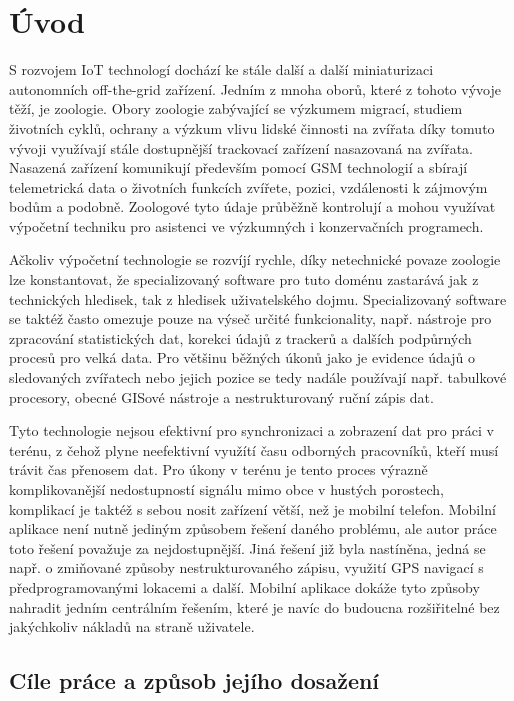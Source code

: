 \chapter*{Úvod}

S rozvojem IoT technologí dochází ke stále další a další miniaturizaci autonomních off-the-grid zařízení. Jedním z mnoha oborů, které z tohoto vývoje těží, je zoologie. Obory zoologie zabývající se výzkumem migrací, studiem životních cyklů, ochrany a výzkum vlivu lidské činnosti na zvířata díky tomuto vývoji využívají stále dostupnější trackovací zařízení nasazovaná na zvířata. Nasazená zařízení komunikují především pomocí GSM technologií a sbírají telemetrická data o životních funkcích zvířete, pozici, vzdálenosti k zájmovým bodům a podobně. Zoologové tyto údaje průběžně kontrolují a mohou využívat výpočetní techniku pro asistenci ve výzkumných i konzervačních programech.

Ačkoliv výpočetní technologie se rozvíjí rychle, díky netechnické povaze zoologie lze konstantovat, že specializovaný software pro tuto doménu zastarává jak z technických hledisek, tak z hledisek uživatelského dojmu. Specializovaný software se taktéž často omezuje pouze na výseč určité funkcionality, např. nástroje pro zpracování statistických dat, korekci údajů z trackerů a dalších podpůrných procesů pro velká data. Pro většinu běžných úkonů jako je evidence údajů o sledovaných zvířatech nebo jejich pozice se tedy nadále používají např. tabulkové procesory, obecné GISové nástroje a nestrukturovaný ruční zápis dat.

Tyto technologie nejsou efektivní pro synchronizaci a zobrazení dat pro práci v terénu, z čehož plyne neefektivní využítí času odborných pracovníků, kteří musí trávit čas přenosem dat. Pro úkony v terénu je tento proces výrazně komplikovanější nedostupností signálu mimo obce v hustých porostech, komplikací je taktéž s sebou nosit zařízení větší, než je mobilní telefon. Mobilní aplikace není nutně jediným způsobem řešení daného problému, ale autor práce toto řešení považuje za nejdostupnější. Jiná řešení již byla nastíněna, jedná se např. o zmiňované způsoby nestrukturovaného zápisu, využití GPS navigací s předprogramovanými lokacemi a další. Mobilní aplikace dokáže tyto způsoby nahradit jedním centrálním řešením, které je navíc do budoucna rozšiřitelné bez jakýchkoliv nákladů na straně uživatele. 

\section*{Cíle práce a způsob jejího dosažení}

